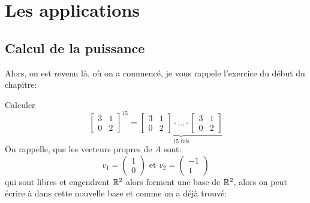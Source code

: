\section{Les applications}
\subsection{Calcul de la puissance}\label{subsec:calcule-de-la-puissance-diagonalisation}
Alors, on est revenu là, où on a commencé, je vous rappele l'exercice du début du chapitre:
\begin{ex}
   Calculer 
   \[
   \begin{bmatrix} 
       3 & 1\\
       0 & 2
   \end{bmatrix}^{15} = \underbrace{
       \begin{bmatrix} 
       3 & 1\\
       0 & 2
       \end{bmatrix}
       \cdot
       \ldots
       \cdot
       \begin{bmatrix} 
       3 & 1\\
       0 & 2
       \end{bmatrix}
   }_{15 \text{ fois}}
   \] 
On rappelle, que les vecteurs propres de $A$ sont: 
\[
v_1 = \begin{pmatrix} 1 \\ 0 \end{pmatrix} \text{ et } v_2 = \begin{pmatrix} -1 \\ 1 \end{pmatrix} 
\] 
qui sont libres et engendrent $\mathbb{R}^2$ alors forment une base de $\mathbb{R}^2$, alors on peut écrire à dans cette nouvelle base et comme on a déjà trouvé:


\end{ex}
